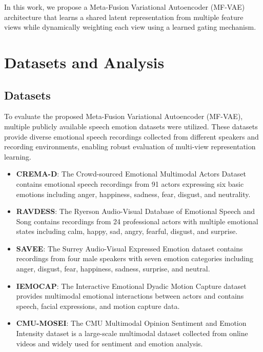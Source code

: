 \documentclass[conference]{IEEEtran}
\begin{document}
In this work, we propose a Meta-Fusion Variational Autoencoder (MF-VAE) architecture that learns a shared latent representation from multiple feature views while dynamically weighting each view using a learned gating mechanism.

\section{Datasets and Analysis}

\subsection{Datasets}

To evaluate the proposed Meta-Fusion Variational Autoencoder (MF-VAE), 
multiple publicly available speech emotion datasets were utilized. 
These datasets provide diverse emotional speech recordings collected 
from different speakers and recording environments, enabling robust 
evaluation of multi-view representation learning.

\begin{itemize}

\item \textbf{CREMA-D}: The Crowd-sourced Emotional Multimodal Actors Dataset 
contains emotional speech recordings from 91 actors expressing six 
basic emotions including anger, happiness, sadness, fear, disgust, 
and neutrality.

\item \textbf{RAVDESS}: The Ryerson Audio-Visual Database of Emotional 
Speech and Song contains recordings from 24 professional actors with 
multiple emotional states including calm, happy, sad, angry, fearful, 
disgust, and surprise.

\item \textbf{SAVEE}: The Surrey Audio-Visual Expressed Emotion dataset 
contains recordings from four male speakers with seven emotion 
categories including anger, disgust, fear, happiness, sadness, 
surprise, and neutral.

\item \textbf{IEMOCAP}: The Interactive Emotional Dyadic Motion Capture 
dataset provides multimodal emotional interactions between actors and 
contains speech, facial expressions, and motion capture data.

\item \textbf{CMU-MOSEI}: The CMU Multimodal Opinion Sentiment and Emotion 
Intensity dataset is a large-scale multimodal dataset collected from 
online videos and widely used for sentiment and emotion analysis.

\end{itemize}
\end{document}
